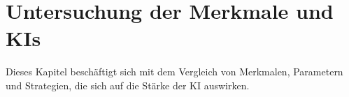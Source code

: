 
\chapter{Untersuchung der Merkmale und KIs}
\label{chap:merkmale}

Dieses Kapitel beschäftigt sich mit dem Vergleich von Merkmalen, Parametern und Strategien, die sich auf die Stärke der KI auswirken.





